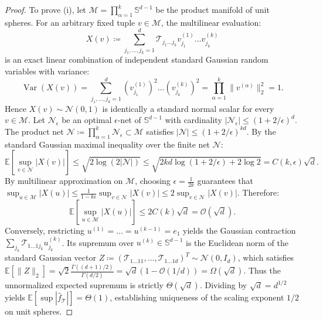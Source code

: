\documentclass[11pt,a4paper,reqno]{amsart}
\theoremstyle{definition}
\numberwithin{equation}{section}
\providecommand{\Sph}{\mathbb{S}}
\providecommand{\Sph}{\mathbb{S}}
\begin{document}
\begin{proof}
To prove (i), let $\mathcal{M} = \prod_{\alpha=1}^k \Sph^{d-1}$ be the product manifold of unit spheres. For an arbitrary fixed tuple $v \in \mathcal{M}$, the multilinear evaluation:
\begin{equation}
    X(v) \coloneqq \sum_{j_1, \dots, j_k = 1}^d \mathcal{T}_{j_1 \dots j_k} v_{j_1}^{(1)} \dots v_{j_k}^{(k)}
\end{equation}
is an exact linear combination of independent standard Gaussian random variables with variance:
\begin{equation}
    \operatorname{Var}(X(v)) = \sum_{j_1, \dots, j_k = 1}^d (v_{j_1}^{(1)})^2 \dots (v_{j_k}^{(k)})^2 = \prod_{\alpha=1}^k \|v^{(\alpha)}\|_2^2 = 1.
\end{equation}
Hence $X(v) \sim \mathcal{N}(0, 1)$ is identically a standard normal scalar for every $v \in \mathcal{M}$. Let $\mathcal{N}_\epsilon$ be an optimal $\epsilon$-net of $\Sph^{d-1}$ with cardinality $|\mathcal{N}_\epsilon| \le (1 + 2/\epsilon)^d$. The product net $\mathcal{N} \coloneqq \prod_{\alpha=1}^k \mathcal{N}_\epsilon \subset \mathcal{M}$ satisfies $|\mathcal{N}| \le (1 + 2/\epsilon)^{k d}$. By the standard Gaussian maximal inequality over the finite net $\mathcal{N}$:
\begin{equation}
    \mathbb{E}\left[ \sup_{v \in \mathcal{N}} |X(v)| \right] \le \sqrt{2 \log(2 |\mathcal{N}|)} \le \sqrt{2 k d \log(1 + 2/\epsilon) + 2\log 2} = C(k, \epsilon) \sqrt{d}.
\end{equation}
By multilinear approximation on $\mathcal{M}$, choosing $\epsilon = \frac{1}{2k}$ guarantees that $\sup_{u \in \mathcal{M}} |X(u)| \le \frac{1}{1 - k\epsilon} \sup_{v \in \mathcal{N}} |X(v)| \le 2 \sup_{v \in \mathcal{N}} |X(v)|$. Therefore:
\begin{equation}
    \mathbb{E}\left[ \sup_{u \in \mathcal{M}} |X(u)| \right] \le 2 C(k) \sqrt{d} = \mathcal{O}(\sqrt{d}).
\end{equation}
Conversely, restricting $u^{(1)} = \dots = u^{(k-1)} = e_1$ yields the Gaussian contraction $\sum_{j_k} \mathcal{T}_{1 \dots 1 j_k} u_{j_k}^{(k)}$. Its supremum over $u^{(k)} \in \Sph^{d-1}$ is the Euclidean norm of the standard Gaussian vector $Z \coloneqq (\mathcal{T}_{1 \dots 1 1}, \dots, \mathcal{T}_{1 \dots 1 d})^T \sim \mathcal{N}(0, I_d)$, which satisfies $\mathbb{E}[\|Z\|_2] = \sqrt{2} \frac{\Gamma((d+1)/2)}{\Gamma(d/2)} = \sqrt{d}(1 - \mathcal{O}(1/d)) = \Omega(\sqrt{d})$. Thus the unnormalized expected supremum is strictly $\Theta(\sqrt{d})$. Dividing by $\sqrt{d} = d^{1/2}$ yields $\mathbb{E}[\sup |\widehat{f}_{\mathcal{T}}|] = \Theta(1)$, establishing uniqueness of the scaling exponent $1/2$ on unit spheres.


\end{proof}
\end{document}
